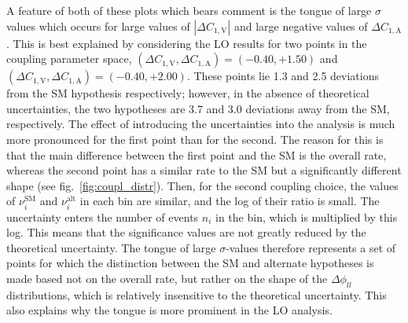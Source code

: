 \documentclass[preprint]{JHEP3}
\newcommand{\SM}{\mathrm{SM}}
\newcommand{\alt}{\mathrm{alt}}
\def\Dphill{\Delta \phi_{ll}}
\def\DConeA{\Delta C_{1,\mathrm{A}}}
\def\DConeV{\Delta C_{1,\mathrm{V}}}
\begin{document}
A feature of both of these plots which bears comment is the tongue of large $\sigma$ values which occurs for large values of $| \DConeV|$ and large 
negative values of $\DConeA$. This is best explained by considering the LO results for two points in the coupling parameter space, 
$(\DConeV,\DConeA)=(-0.40,+1.50)$ and $(\DConeV,\DConeA)=(-0.40,+2.00)$. These points lie 1.3 and 2.5 deviations from the SM hypothesis respectively; 
however, in the absence of theoretical uncertainties, the two hypotheses are 3.7 and 3.0 deviations away from the SM, respectively. 
The effect of introducing the uncertainties into the analysis is much more pronounced for the first point than for the second. 
The reason for this is that the main difference between the first point and the SM is the overall rate, whereas the second point has a similar rate to the 
SM but a significantly different shape (see fig.~\ref{fig:coupl_distr}). Then, for the second coupling choice, the values of $\nu_i^{\SM}$ and $\nu_i^{\alt}$ 
in each bin are similar, and the 
log of their ratio is small. The uncertainty enters the number of events $n_i$ in the bin, which is multiplied by this log. 
This means that the significance values are not greatly reduced by the theoretical uncertainty. 
The tongue of large $\sigma$-values therefore represents a set of points for which the distinction between the SM and alternate hypotheses 
is made based not on the overall rate, but rather on the shape of the $\Dphill$ distributions, which is relatively insensitive to the theoretical uncertainty. 
This also explains why the tongue is more prominent in the LO analysis.

\end{document}
